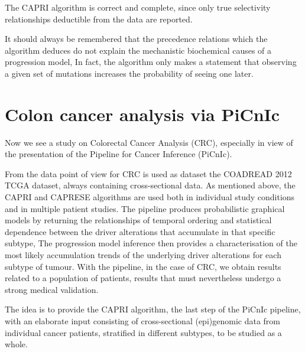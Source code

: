The CAPRI algorithm is correct and complete, since only true selectivity relationships deductible from the data are
reported.

It should always be remembered that the precedence relations which the algorithm deduces do not explain the
mechanistic biochemical causes of a progression model, In fact, the algorithm only makes a statement that
observing a given set of mutations increases the probability of seeing one later.

\section{Colon cancer analysis via PiCnIc}
Now we see a study on Colorectal Cancer Analysis (CRC), especially in view of the
presentation of the Pipeline for Cancer Inference (PiCnIc).

From the data point of view for CRC is used as dataset the COADREAD 2012 TCGA
dataset, always containing cross-sectional data. As mentioned above, the CAPRI
and CAPRESE algorithms are used both in individual study conditions and in multiple
patient studies. The pipeline produces probabilistic graphical models by returning
the relationships of temporal ordering and statistical dependence between the
driver alterations that accumulate in that specific subtype, The progression model
inference then provides a characterisation of the most likely accumulation trends
of the underlying driver alterations for each subtype of tumour. With the pipeline,
in the case of CRC, we obtain results related to a population of patients, results
that must nevertheless undergo a strong medical validation.

The idea is to provide the CAPRI algorithm, the last step of the PiCnIc pipeline,
with an elaborate input consisting of cross-sectional (epi)genomic data from
individual cancer patients, stratified in different subtypes, to be studied as a
whole.
